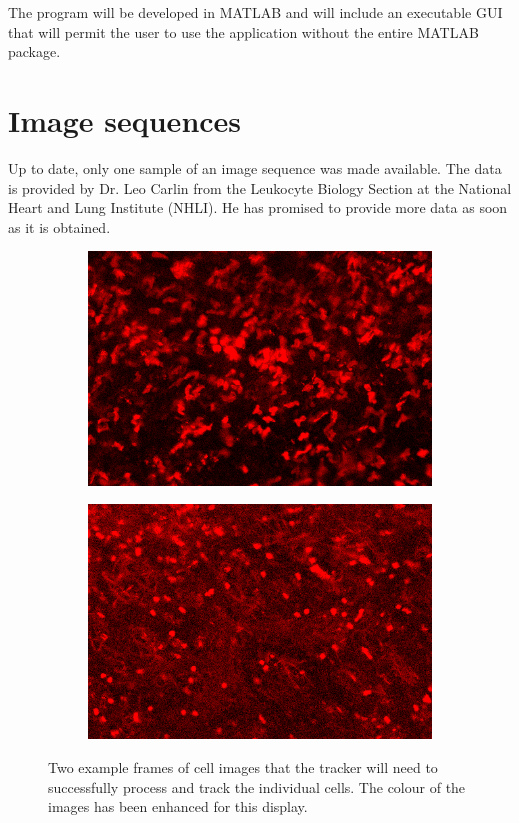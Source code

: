 \documentclass[12pt,a4paper,openany]{book}
\begin{document}
The program will be developed in MATLAB and will include an executable GUI that will permit the user to use the application without the entire MATLAB package.

\section{Image sequences}

Up to date, only one sample of an image sequence was made available. The data is provided by Dr. Leo Carlin from the Leukocyte Biology Section at the National Heart and Lung Institute (NHLI). He has promised to provide more data as soon as it is obtained.

\begin{figure}
	\begin{subfigure}{.49\textwidth}
	  \includegraphics[width=\textwidth]{frame1.png}
	\end{subfigure}%
	\hfill
	\begin{subfigure}{.49\textwidth}
	  \includegraphics[width=\textwidth]{frame2.png}
	\end{subfigure}
	\caption{Two example frames of cell images that the tracker will need to successfully process and track the individual cells. The colour of the images has been enhanced for this display.}
	\label{fig:sampleframes}
\end{figure}
\end{document}
